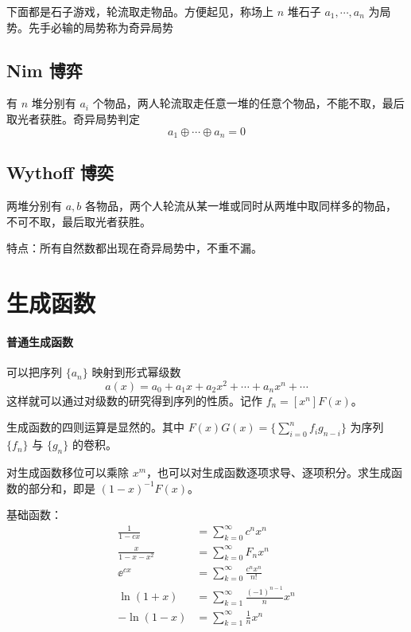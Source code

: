 \documentclass{probook}
\begin{document}
\begin{multicols}{2}
下面都是石子游戏，轮流取走物品。方便起见，称场上 $n$ 堆石子 $a_1,\cdots,a_n$ 为局势。先手必输的局势称为奇异局势

\subsection{Nim 博弈}

有 $n$ 堆分别有 $a_i$ 个物品，两人轮流取走任意一堆的任意个物品，不能不取，最后取光者获胜。奇异局势判定
\[a_1 \oplus \cdots \oplus a_n =0\]

\subsection{Wythoff 博奕}

两堆分别有 $a,b$ 各物品，两个人轮流从某一堆或同时从两堆中取同样多的物品，不可不取，最后取光者获胜。



特点：所有自然数都出现在奇异局势中，不重不漏。

\section{生成函数}

\paragraph{普通生成函数}
可以把序列 $\{a_n\}$ 映射到形式幂级数
\[ a(x) = a_0 + a_1 x + a_2 x^2 + \cdots + a_nx^n + \cdots \]
这样就可以通过对级数的研究得到序列的性质。记作 $f_n = [x^n]F(x)$。

生成函数的四则运算是显然的。其中 $F(x)G(x) = \{\sum\limits_{i=0}^n f_ig_{n-i}\}$ 为序列 $\{f_n\}$ 与 $\{g_n\}$ 的卷积。

对生成函数移位可以乘除 $x^m$，也可以对生成函数逐项求导、逐项积分。求生成函数的部分和，即是 $(1-x)^{-1}F(x)$。

基础函数：
\begin{equation*}
    \begin{aligned}
        \frac{1}{1-cx} &= \sum_{k=0}^\infty c^nx^n\\
        \frac{x}{1-x-x^2} &= \sum_{k=0}^\infty F_nx^n \\
        \ee^{cx} &= \sum_{k=0}^\infty \frac{c^nx^n}{n!} \\
        \ln(1+x) &= \sum_{k=1}^\infty \frac{(-1)^{n-1}}{n} x^n\\
        -\ln(1-x) &= \sum_{k=1}^\infty \frac{1}{n} x^n
    \end{aligned}
\end{equation*}


\end{multicols}
\end{document}
